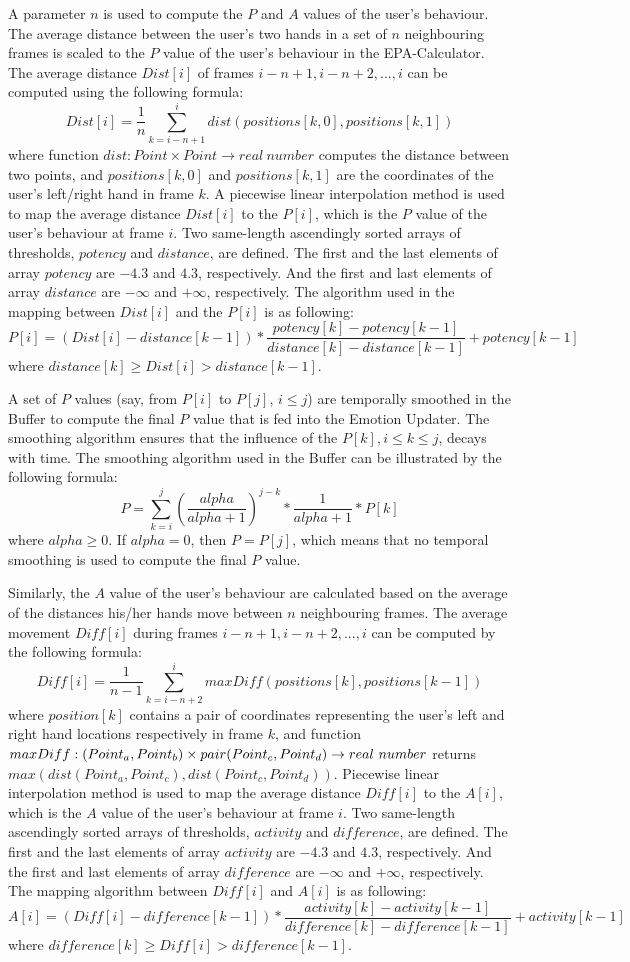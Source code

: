 A parameter $n$ is used to compute the $P$ and $A$ values of the user's behaviour. The average distance between the user's two hands in a set of $n$ neighbouring frames is scaled to the $P$ value of the user's behaviour in the EPA-Calculator. The average distance $Dist[i]$ of frames $i-n+1, i-n+2, ... , i$ can be computed using the following formula:
$$Dist[i]=\dfrac{1}{n} \sum_{k=i-n+1}^{i}dist(positions[k,0],positions[k,1])$$
where function $dist: Point \times Point \to real\ number$ computes the distance between two points, and $positions[k,0]$ and $positions[k,1]$ are the coordinates of the user's left/right hand in frame $k$. A piecewise linear interpolation method is used to map the average distance $Dist[i]$ to the $P[i]$, which is the $P$ value of the user's behaviour at frame $i$. Two same-length ascendingly sorted arrays of thresholds, $potency$ and $distance$, are defined. The first and the last elements of array $potency$ are $-4.3$ and $4.3$, respectively. And the first and last elements of array $distance$ are $-\infty$ and $+\infty$, respectively. The algorithm used in the mapping between $Dist[i]$ and the $P[i]$ is as following:
$$P[i]=(Dist[i]-distance[k-1]) * \dfrac{potency[k]-potency[k-1]}{distance[k]-distance[k-1]} + potency[k-1]$$
where $distance[k] \geq Dist[i]>distance[k-1]$.

A set of $P$ values (say, from $P[i]$ to $P[j]$, $i \leq j$) are temporally smoothed in the Buffer to compute the final $P$ value that is fed into the Emotion Updater. The smoothing algorithm ensures that the influence of the $P[k], i \leq k \leq j$, decays with time. The smoothing algorithm used in the Buffer can be illustrated by the following formula:
$$P=\sum_{k=i}^{j}(\dfrac{alpha}{alpha+1})^{j-k}*\dfrac{1}{alpha+1}*P[k]$$ where $alpha \geq 0$.
If $alpha=0$, then $P=P[j]$, which means that no temporal smoothing is used to compute the final $P$ value.

Similarly, the $A$ value of the user's behaviour are calculated based on the average of the distances his/her hands move between $n$ neighbouring frames. The average movement $Diff[i]$ during frames $i-n+1, i-n+2, ... , i$ can be computed by the following formula:
$$Diff[i]=\dfrac{1}{n-1}\sum_{k=i-n+2}^{i}maxDiff(positions[k],positions[k-1])$$
where $position[k]$ contains a pair of coordinates representing the user's left and right hand locations respectively in frame $k$, and function $maxDiff: (Point_a, Point_b) \times pair(Point_c,\\ Point_d) \to real\ number$ returns $max(dist(Point_a, Point_c), dist(Point_c, Point_d))$. Piecewise linear interpolation method is used to map the average distance $Diff[i]$ to the $A[i]$, which is the $A$ value of the user's behaviour at frame $i$. Two same-length ascendingly sorted arrays of thresholds, $activity$ and $difference$, are defined. The first and the last elements of array $activity$ are $-4.3$ and $4.3$, respectively. And the first and last elements of array $difference$ are $-\infty$ and $+\infty$, respectively. The mapping algorithm between $Diff[i]$ and $A[i]$ is as following:
$$A[i]=(Diff[i]-difference[k-1])*\dfrac{activity[k] - activity[k-1]}{difference[k] - difference[k-1]}+activity[k-1]$$
where $difference [k] \geq Diff[i] > difference[k-1]$.

